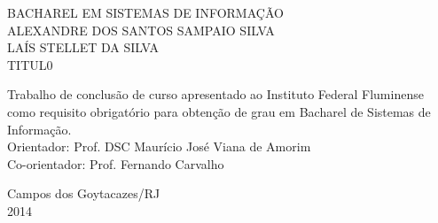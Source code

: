 \begin{titlepage}
 \begin{figure}[ht]
 \centering
 \end{figure}
 \begin{center}
   {\large BACHAREL EM SISTEMAS DE INFORMAÇÃO} \\ [3.5cm]
   {\large ALEXANDRE DOS SANTOS SAMPAIO SILVA} \\ [1cm]
   {\large LAÍS STELLET DA SILVA} \\ [2cm]
   {\large TITUL0 } \\[3cm]
   \hspace{.45\textwidth} %
   \begin{minipage}{0.5\textwidth}
   \begin{espacosimples}
        Trabalho de conclusão de curso apresentado ao Instituto Federal Fluminense como requisito obrigatório para obtenção de grau em Bacharel de Sistemas de Informação.\\[1.5cm]
        Orientador: Prof. DSC Maurício José Viana de Amorim\\
        Co-orientador: Prof. Fernando Carvalho
    \end{espacosimples}
    \end{minipage}
   \vfill
   {\large Campos dos Goytacazes/RJ} \\
   {\large 2014}
 \end{center}
\end{titlepage}
